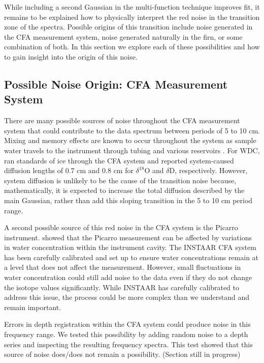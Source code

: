 \documentclass[draft, jgrga]{AGUTeX}
\begin{document}
\begin{article}
While including a second Gaussian in the multi-function technique improves fit, it remains to be explained how to physically interpret the red noise in the transition zone of the spectra. Possible origins of this transition include noise generated in the CFA measurement system, noise generated naturally in the firn, or some combination of both. In this section we explore each of these possibilities and how to gain insight into the origin of this noise.

\subsection{Possible Noise Origin: CFA Measurement System}

There are many possible sources of noise throughout the CFA measurement system that could contribute to the data spectrum between periods of 5 to 10 cm. Mixing and memory effects are known to occur throughout the system as sample water travels to the instrument through tubing and various reservoirs \citep{Gkinis2011a}. For WDC, \citet{Jones2017b} ran standards of ice through the CFA system and reported system-caused diffusion lengths of 0.7 cm and 0.8 cm for $\delta^{18}\mathrm{O}$ and $\delta\mathrm{D}$, respectively. However, system diffusion is unlikely to be the cause of the transition noise because, mathematically, it is expected to increase the total diffusion described by the main Gaussian, rather than add this sloping transition in the 5 to 10 cm period range.

A second possible source of this red noise in the CFA system is the Picarro instrument. \citet{Gkinis2011b} showed that the Picarro measurement can be affected by variations in water concentration within the instrument cavity. The INSTAAR CFA system has been carefully calibrated and set up to ensure water concentrations remain at a level that does not affect the measurement. However, small fluctuations in water concentration could still add noise to the data even if they do not change the isotope values significantly. While INSTAAR has carefully calibrated to address this issue, the process could be more complex than we understand and remain important.

Errors in depth registration within the CFA system could produce noise in this frequency range. We tested this possibility by adding random noise to a depth series and inspecting the resulting frequency spectra. This test showed that this source of noise does/does not remain a possibility. (Section still in progress)


\end{article}
\end{document}
